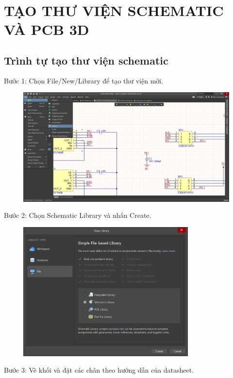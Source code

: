 \chapter{TẠO THƯ VIỆN SCHEMATIC VÀ PCB 3D}
    \section{Trình tự tạo thư viện schematic}
        Bước 1: Chọn File/New/Library để tạo thư viện mới.
        \begin{figure}[H]
            \centering
            \includegraphics[width=1\textwidth]{pictures/ch3.1.png}
        \end{figure}
        Bước 2: Chọn Schematic Library và nhấn Create.
        \begin{figure}[H]
            \centering
            \includegraphics[width=0.8\textwidth]{pictures/ch3.2.png}
        \end{figure}
        Bước 3: Vẽ khối và đặt các chân theo hướng dẫn của datasheet.
